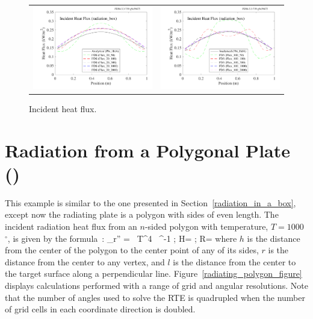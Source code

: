 \documentclass[11pt]{book}
\begin{document}
\begin{figure}[ht]
\centering
\begin{tabular*}{\textwidth}{lr}
\includegraphics[width=3.2in]{SCRIPT_FIGURES/radiation_box_20} &
\includegraphics[width=3.2in]{SCRIPT_FIGURES/radiation_box_100}
\end{tabular*}
\caption{Incident heat flux.}\label{fig_incident_heat_flux}
\end{figure}


\section{Radiation from a Polygonal Plate (\texorpdfstring{}{radiating\_polygon}) }
\label{radiating_polygon}

This example is similar to the one presented in Section~\ref{radiation_in_a_box}, except now the radiating plate is a polygon with sides of even length. The incident radiation heat flux from an $n$-sided polygon with temperature, $T=1000$~$^\circ$, is given by the formula~\cite{Siegel:1}:
\be
   \dq_{\rm r}'' = \sigma \, T^4 \,  \; \tan^{-1}  \quad ; \quad H= \quad ; \quad R=
\ee
where $h$ is the distance from the center of the polygon to the center point of any of its sides, $r$ is the distance from the center to any vertex, and $l$ is the distance from the center to the target surface along a perpendicular line. Figure~\ref{radiating_polygon_figure} displays calculations performed with a range of grid and angular resolutions. Note that the number of angles used to solve the RTE is quadrupled when the number of grid cells in each coordinate direction is doubled.
\end{document}
